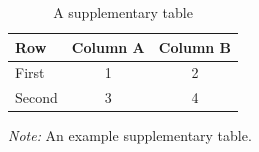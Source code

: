 \documentclass[
    fontsize=12pt,fleqn,
    letterpaper,oneside,paper=portrait,
]{scrartcl}
\begin{document}
\begin{table}[h]\centering
  \begin{threeparttable}
    \caption{A supplementary table\label{tbl:supp-example}}
    \begin{tabular}{lcc}
    \toprule
    Row & Column A & Column B \\
    \midrule
    First  & 1 & 2 \\
    Second & 3 & 4 \\
    \bottomrule
    \end{tabular}
    \begin{tablenotes}\footnotesize
      \emph{Note:} An example supplementary table.
    \end{tablenotes}
  \end{threeparttable}
\end{table}
\end{document}
